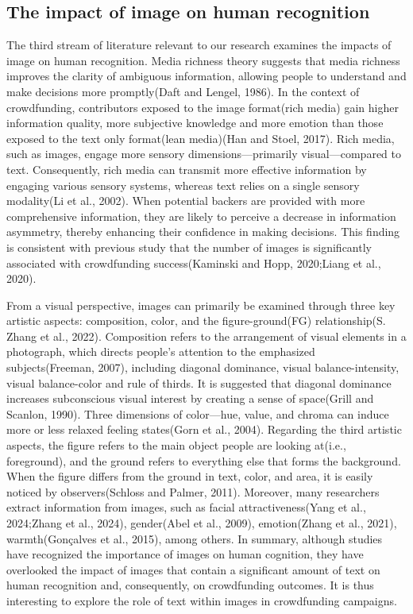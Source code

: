 \documentclass[a4paper]{article}
\begin{document}
\subsection{The impact of image on human recognition}

The third stream of literature relevant to our research examines the impacts of image on human recognition. Media richness theory suggests that media richness improves the clarity of ambiguous information, allowing people to understand and make decisions more promptly(Daft and Lengel, 1986). In the context of crowdfunding, contributors exposed to the image format(rich media) gain higher information quality, more subjective knowledge and more emotion than those exposed to the text only format(lean media)(Han and Stoel, 2017). Rich media, such as images, engage more sensory dimensions—primarily visual—compared to text. Consequently, rich media can transmit more effective information by engaging various sensory systems, whereas text relies on a single sensory modality(Li et al., 2002). When potential backers are provided with more comprehensive information, they are likely to perceive a decrease in information asymmetry, thereby enhancing their confidence in making decisions. This finding is consistent with previous study that the number of images is significantly associated with crowdfunding success(Kaminski and Hopp, 2020;Liang et al., 2020).

From a visual perspective, images can primarily be examined through three key artistic aspects: composition, color, and the figure-ground(FG) relationship(S. Zhang et al., 2022). Composition refers to the arrangement of visual elements in a photograph, which directs people's attention to the emphasized subjects(Freeman, 2007), including diagonal dominance, visual balance-intensity, visual balance-color and rule of thirds. It is suggested that diagonal dominance increases subconscious visual interest by creating a sense of space(Grill and Scanlon, 1990). Three dimensions of color—hue, value, and chroma can induce more or less relaxed feeling states(Gorn et al., 2004). Regarding the third artistic aspects, the figure refers to the main object people are looking at(i.e., foreground), and the ground refers to everything else that forms the background. When the figure differs from the ground in text, color, and area, it is easily noticed by observers(Schloss and Palmer, 2011). Moreover, many researchers extract information from images, such as facial attractiveness(Yang et al., 2024;Zhang et al., 2024), gender(Abel et al., 2009), emotion(Zhang et al., 2021), warmth(Gonçalves et al., 2015),  among others. In summary, although studies have recognized the importance of images on human cognition, they have overlooked the impact of images that contain a significant amount of text on human recognition and, consequently, on crowdfunding outcomes. It is thus interesting to explore the role of text within images in crowdfunding campaigns.
\end{document}
